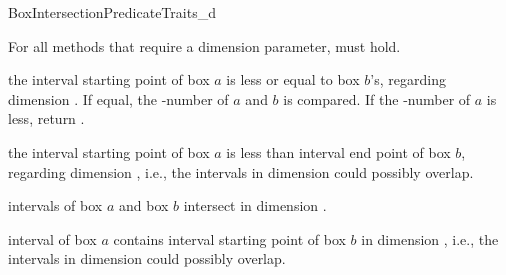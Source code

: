 \begin{ccRefConcept}{BoxIntersectionPredicateTraits_d}
\begin{ccAdvanced}
\ccOperations
{}
For all methods that require a dimension parameter,  must hold.

  {the interval starting point of box $a$ is less or equal to box
      $b$'s, regarding dimension . If equal, the
      -number of $a$ and $b$ is compared. If the
      -number of $a$ is less, return .} 

  {the interval starting point of box $a$ is less than interval end point of
      box $b$, regarding dimension , i.e., the intervals in
      dimension  could possibly overlap.}

  {intervals of box $a$ and box $b$ intersect in dimension .}

  {interval of box $a$ contains interval starting point of box $b$ in
  dimension , i.e., the intervals in dimension 
  could possibly overlap.} 

\ccHasModels


\ccSeeAlso

\\


\end{ccAdvanced}
\end{ccRefConcept}
